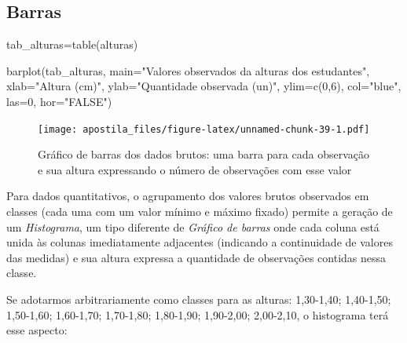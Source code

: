 \documentclass[
]{book}
\newenvironment{Shaded}{\begin{snugshade}}{\end{snugshade}}
\newcommand{\AttributeTok}[1]{\textcolor[rgb]{0.77,0.63,0.00}{#1}}
\newcommand{\DecValTok}[1]{\textcolor[rgb]{0.00,0.00,0.81}{#1}}
\newcommand{\FunctionTok}[1]{\textcolor[rgb]{0.00,0.00,0.00}{#1}}
\newcommand{\NormalTok}[1]{#1}
\newcommand{\OtherTok}[1]{\textcolor[rgb]{0.56,0.35,0.01}{#1}}
\newcommand{\StringTok}[1]{\textcolor[rgb]{0.31,0.60,0.02}{#1}}
\begin{document}
\hypertarget{barras}{%
\subsection{Barras}\label{barras}}

\hfill\break

\begin{Shaded}
\begin{Highlighting}[]
\NormalTok{tab\_alturas}\OtherTok{=}\FunctionTok{table}\NormalTok{(alturas)}

\FunctionTok{barplot}\NormalTok{(tab\_alturas,}
        \AttributeTok{main=}\StringTok{"Valores observados da alturas dos estudantes"}\NormalTok{,}
        \AttributeTok{xlab=}\StringTok{"Altura (cm)"}\NormalTok{,}
        \AttributeTok{ylab=}\StringTok{"Quantidade observada (un)"}\NormalTok{,}
        \AttributeTok{ylim=}\FunctionTok{c}\NormalTok{(}\DecValTok{0}\NormalTok{,}\DecValTok{6}\NormalTok{),}
        \AttributeTok{col=}\StringTok{"blue"}\NormalTok{,}
        \AttributeTok{las=}\DecValTok{0}\NormalTok{, }
        \AttributeTok{hor=}\StringTok{"FALSE"}\NormalTok{)}
\end{Highlighting}
\end{Shaded}

\begin{figure}
\centering
\texttt{[image: apostila\_files/figure-latex/unnamed-chunk-39-1.pdf]}
\caption{\label{fig:unnamed-chunk-39}Gráfico de barras dos dados brutos: uma barra para cada observação e sua altura expressando o número de observações com esse valor}
\end{figure}

\hfill\break

Para dados quantitativos, o agrupamento dos valores brutos observados em classes (cada uma com um valor mínimo e máximo fixado) permite a geração de um \emph{Histograma}, um tipo diferente de \emph{Gráfico de barras} onde cada coluna está unida às colunas imediatamente adjacentes (indicando a continuidade de valores das medidas) e sua altura expressa a quantidade de observações contidas nessa classe.

\hfill\break

Se adotarmos arbitrariamente como classes para as alturas: 1,30-1,40; 1,40-1,50; 1,50-1,60; 1,60-1,70; 1,70-1,80; 1,80-1,90; 1,90-2,00; 2,00-2,10, o histograma terá esse aspecto:

\hfill\break
\end{document}
